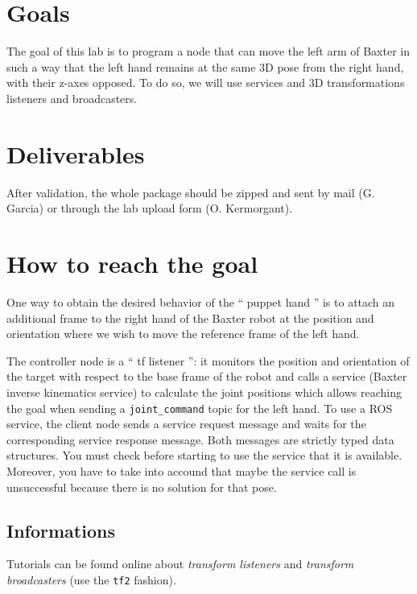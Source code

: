 \documentclass{ecnreport}
\author{G. Garcia, O. Kermorgant}
\begin{document}


\section{Goals}

The goal of this lab is to program a node that can move the left arm of Baxter in such a way that the left hand
remains at the same 3D pose from the right hand, with their z-axes opposed. To do so, we will use services and
3D transformations listeners and broadcasters.

\section{Deliverables}

After validation, the whole package should be zipped and sent by mail (G. Garcia) or through the lab upload form (O. Kermorgant).

\section{How to reach the goal}

One way to obtain the desired behavior of the `` puppet hand '' is to attach an additional frame to the
right hand of the Baxter robot at the position and orientation where we wish to move the reference
frame of the left hand.

The controller node is a `` tf listener '': it monitors the position and orientation of the target with
respect to the base frame of the robot and calls a service (Baxter inverse kinematics service) to
calculate the joint positions which allows reaching the goal when sending a \texttt{joint\_command}
topic for the left hand. To use a ROS service, the client node sends a service request message and
waits for the corresponding service response message. Both messages are strictly typed data
structures. You must check before starting to use the service that it is available. Moreover, you have
to take into accound that maybe the service call is unsuccessful because there is no solution for that
pose.


\subsection{Informations}

Tutorials can be found online about \emph{transform listeners} and \emph{transform broadcasters} (use the \texttt{tf2} fashion).
\end{document}
